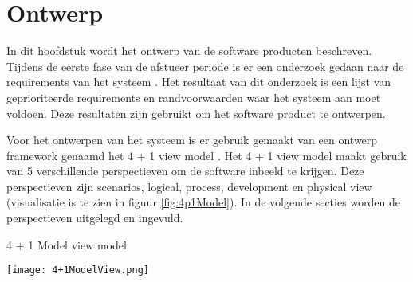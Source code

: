 \chapter{Ontwerp}
In dit hoofdstuk wordt het ontwerp van de software producten beschreven.
Tijdens de eerste fase van de afstueer periode is er een onderzoek gedaan naar de requirements van het systeem \parencite{DanteOnderzoek}.
Het resultaat van dit onderzoek is een lijst van geprioriteerde requirements en randvoorwaarden waar het systeem aan moet voldoen.
Deze resultaten zijn gebruikt om het software product te ontwerpen.

\whitespace
Voor het ontwerpen van het systeem is er gebruik gemaakt van een ontwerp framework genaamd het 4 + 1 view model \parencite{4+1ViewModelPaper}.
Het 4 + 1 view model maakt gebruik van 5 verschillende perspectieven om de software inbeeld te krijgen.
Deze perspectieven zijn scenarios, logical, process, development en physical view (visualisatie is te zien in figuur \ref{fig:4p1Model}).
In de volgende secties worden de perspectieven uitgelegd en ingevuld. 

\whitespace[2]
\begin{graphic}
	\captionsetup{type=figure}
    \caption{4 + 1 Model view model \parencite{4+1ViewModelPaper}}
	\texttt{[image: 4+1ModelView.png]}
	\label{fig:4p1Model}
\end{graphic}

\newpage

\newpage

\newpage




